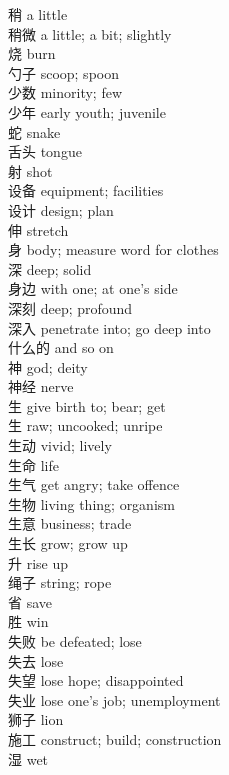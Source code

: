 稍 \quad a little\\
稍微 \quad a little; a bit; slightly\\
烧 \quad burn\\
勺子 \quad scoop; spoon\\
少数 \quad minority; few\\
少年 \quad early youth; juvenile\\
蛇 \quad snake\\
舌头 \quad tongue\\
射 \quad shot\\
设备 \quad equipment; facilities\\
设计 \quad design; plan\\
伸 \quad stretch\\
身 \quad body; measure word for clothes\\
深 \quad deep; solid\\
身边 \quad with one; at one's side\\
深刻 \quad deep; profound\\
深入 \quad penetrate into; go deep into\\
什么的 \quad and so on\\
神 \quad god; deity\\
神经 \quad nerve\\
生 \quad give birth to; bear; get\\
生 \quad raw; uncooked; unripe\\
生动 \quad vivid; lively\\
生命 \quad life\\
生气 \quad get angry; take offence\\
生物 \quad living thing; organism\\
生意 \quad business; trade\\
生长 \quad grow; grow up\\
升 \quad rise up\\
绳子 \quad string; rope\\
省 \quad save\\
胜 \quad win\\
失败 \quad be defeated; lose\\
失去 \quad lose\\
失望 \quad lose hope; disappointed\\
失业 \quad lose one's job; unemployment\\
狮子 \quad lion\\
施工 \quad construct; build; construction\\
湿 \quad wet\\

